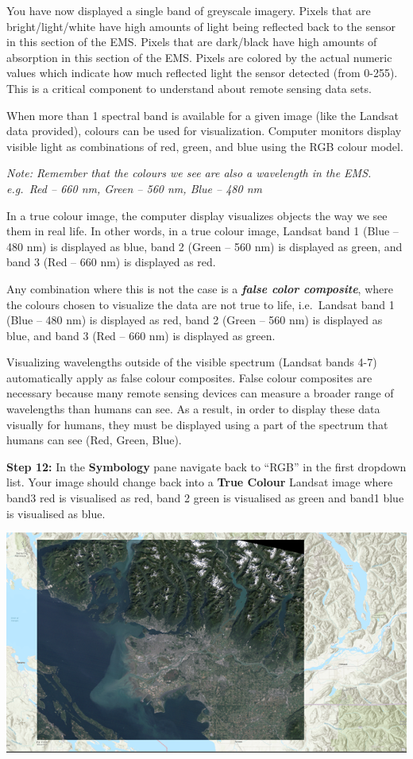 \documentclass[
]{book}
\begin{document}
You have now displayed a single band of greyscale imagery. Pixels that are bright/light/white have high amounts of light being reflected back to the sensor in this section of the EMS. Pixels that are dark/black have high amounts of absorption in this section of the EMS. Pixels are colored by the actual numeric values which indicate how much reflected light the sensor detected (from 0-255). This is a critical component to understand about remote sensing data sets.

When more than 1 spectral band is available for a given image (like the Landsat data provided), colours can be used for visualization. Computer monitors display visible light as combinations of red, green, and blue using the RGB colour model.

\emph{Note: Remember that the colours we see are also a wavelength in the EMS. e.g.~Red -- 660 nm, Green -- 560 nm, Blue -- 480 nm}

In a true colour image, the computer display visualizes objects the way we see them in real life. In other words, in a true colour image, Landsat band 1 (Blue -- 480 nm) is displayed as blue, band 2 (Green -- 560 nm) is displayed as green, and band 3 (Red -- 660 nm) is displayed as red.

Any combination where this is not the case is a \textbf{\emph{false color composite}}, where the colours chosen to visualize the data are not true to life, i.e.~Landsat band 1 (Blue -- 480 nm) is displayed as red, band 2 (Green -- 560 nm) is displayed as blue, and band 3 (Red -- 660 nm) is displayed as green.

Visualizing wavelengths outside of the visible spectrum (Landsat bands 4-7) automatically apply as false colour composites. False colour composites are necessary because many remote sensing devices can measure a broader range of wavelengths than humans can see. As a result, in order to display these data visually for humans, they must be displayed using a part of the spectrum that humans can see (Red, Green, Blue).

\textbf{Step 12:} In the \textbf{Symbology} pane navigate back to ``RGB'' in the first dropdown list. Your image should change back into a \textbf{True Colour} Landsat image where band3 red is visualised as red, band 2 green is visualised as green and band1 blue is visualised as blue.

\begin{center}\includegraphics[width=1\linewidth]{images/01-true-colour-landsat-image} \end{center}
\end{document}
